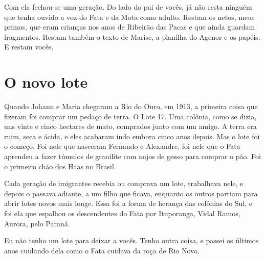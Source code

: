\documentclass[
  brazilian,
  11pt,
  openany]{book}
\begin{document}
Com ela fechou-se uma geração. Do lado do pai de vocês, já não resta
ninguém que tenha ouvido a voz do Fata e da Mota como adulto. Restam os
netos, meus primos, que eram crianças nos anos de Ribeirão das Pacas e
que ainda guardam fragmentos. Restam também o texto de Marise, a
planilha do Agenor e os papéis. E restam vocês.

\section{O novo lote}\label{o-novo-lote-1}

Quando Johann e Maria chegaram a Rio do Ouro, em 1913, a primeira coisa
que fizeram foi comprar um pedaço de terra. O Lote 17. Uma colônia, como
se dizia, uns vinte e cinco hectares de mato, comprados junto com um
amigo. A terra era ruim, seca e ácida, e eles acabaram indo embora cinco
anos depois. Mas o lote foi o começo. Foi nele que nasceram Fernando e
Alexandre, foi nele que o Fata aprendeu a fazer túmulos de granilite com
anjos de gesso para comprar o pão. Foi o primeiro chão dos Haas no
Brasil.

Cada geração de imigrantes recebia ou comprava um lote, trabalhava nele,
e depois o passava adiante, a um filho que ficava, enquanto os outros
partiam para abrir lotes novos mais longe. Essa foi a forma de herança
das colônias do Sul, e foi ela que espalhou os descendentes do Fata por
Ituporanga, Vidal Ramos, Aurora, pelo Paraná.

Eu não tenho um lote para deixar a vocês. Tenho outra coisa, e passei os
últimos anos cuidando dela como o Fata cuidava da roça de Rio Novo.
\end{document}
